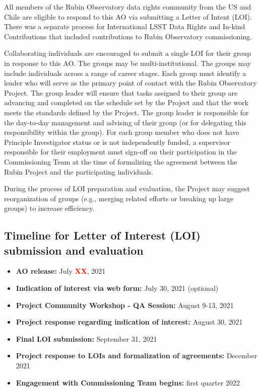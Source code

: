 \documentclass[SE,authoryear,toc]{lsstdoc}
\newcommand{\FIXME}[1]{{\bf \textcolor{red}{#1}}}
\begin{document}
All members of the Rubin Observatory data rights community from the US and Chile  are eligible to respond to this AO via submitting a Letter of Intent (LOI). There was a separate process for International LSST Data Rights and In-kind Contributions that included contributions to Rubin Observatory commissioning.

Collaborating individuals are encouraged to submit a single LOI for their group in response to this AO. The groups may be multi-institutional. The groups may include individuals across a range of career stages. Each group must identify a leader who will serve as the primary point of contact with the Rubin Observatory Project. The group leader will ensure that tasks assigned to their group are advancing and completed on the schedule set by the Project and that the work meets the standards defined by the Project. The group leader is responsible for the day-to-day management and advising of their group (or for delegating this responsibility within the group). For each group member who does not have Principle Investigator status or is not independently funded, a supervisor responsible for their employment must sign-off on their participation in the Commissioning Team at the time of formalizing the agreement between the Rubin Project and the participating individuals.

During the process of LOI preparation and evaluation, the Project may suggest reorganization of groups (e.g., merging related efforts or breaking up large groups) to increase efficiency.

\subsection{Timeline for Letter of Interest (LOI) submission and evaluation}

\begin{itemize}
\item \textbf{AO release:} July \FIXME{XX}, 2021
\item \textbf{Indication of interest via web form:} July 30, 2021 (optional)
\item \textbf{Project Community Workshop - QA Session:} August 9-13, 2021
\item \textbf{Project response regarding indication of interest:} August 30, 2021
\item \textbf{Final LOI submission:} September 31, 2021
\item \textbf{Project response to LOIs and formalization of agreements:} December 2021
\item \textbf{Engagement with Commissioning Team begins:} first quarter 2022
\end{itemize}
\end{document}
